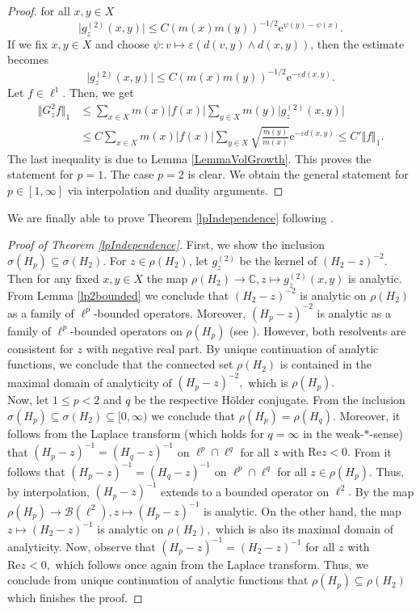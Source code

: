 \documentclass[10pt]{amsart}
\theoremstyle{definition}
\begin{document}
\begin{proof}
    for all $x,y\in X$
    \[\vert g_z^{(2)}(x,y)\vert\leq C(m(x)m(y))^{-1\slash 2}\mathrm{e}^{\psi(y)-\psi(x)}.\]
    If we  fix $x,y\in X$ and choose $\psi: v\mapsto \varepsilon (d(v,y)\wedge d(x,y))$, then the estimate becomes
    \[\vert g^{(2)}_z(x,y)\vert\leq C(m(x)m(y))^{-1\slash 2}\mathrm{e}^{-\varepsilon d(x,y)}.\] Let $f\in\ell^1.$ Then, we get
\begin{align*}
    \Vert G^2_zf\Vert_1&\leq\sum_{x\in X }m(x)\vert f(x)\vert\sum_{y\in X }m(y)\vert g^{(2)}_z(x,y)\vert\\&\leq C\sum_{x\in X }m(x)\vert f(x)\vert\sum_{y\in X }\sqrt{\frac{m(y)}{m(x)}}\mathrm{e}^{-\varepsilon d(x,y)}\leq C'\Vert f\Vert_1.
\end{align*}
The last inequality is due to Lemma \ref{LemmaVolGrowth}. This proves the statement for $p = 1.$ The case $p = 2$ is clear. We obtain the general statement for $p\in [1,\infty]$ via interpolation and duality arguments.
\end{proof}
 We are finally able to prove Theorem \ref{lpIndependence} following \cite{BauerHuaKeller}.
 \begin{proof}[Proof of Theorem \ref{lpIndependence}]
    
    First, we show the inclusion $\sigma( H_p)\subseteq \sigma( H_2).$ For $z\in\rho( H_2)$, let $g_z^{(2)}$ be the kernel of $( H_2-z)^{-2}.$ Then for any fixed $x,y\in X$ the map $\rho( H_2)\rightarrow\mathbb{C},z\mapsto g^{(2)}_z(x,y)$ is analytic. From Lemma \ref{lp2bounded} we conclude that $( H_2-z)^{-2}$ is analytic on $\rho( H_2)$ as a family of $\ell^p$-bounded operators. Moreover, $( H_p-z)^{-2}$ is analytic as a family of $\ell^p$-bounded operators on $\rho( H_p)$ (see \cite[Lemma 3.2]{HempelVoigt1986}). However, both resolvents are consistent for $z$ with negative real part. By unique continuation of analytic functions, we conclude that the connected set $\rho( H_2)$ is contained in the maximal domain of analyticity of $( H_p-z)^{-2},$ which is $\rho( H_p).$\\
    Now, let $1\leq p< 2$ and $q$ be the respective H\"older conjugate. From the inclusion $\sigma(H_p)\subseteq\sigma(H_2)\subseteq [0,\infty)$ we conclude that $\rho(H_p) = \rho(H_q).$ Moreover, it follows from the Laplace transform (which holds for $q= \infty$ in the weak-$\ast$-sense) that $(H_p-z)^{-1} = (H_q-z)^{-1}$ on $\ell^p\cap\ell^q$ for all $z$ with $\mathrm{Re}z<0.$ From \cite[Corollary~1.4]{HempelVoigt1987} it follows that $(H_p-z)^{-1} = (H_q-z)^{-1}$ on $\ell^p\cap\ell^q$ for all $z\in\rho(H_p).$ Thus, by interpolation, $(H_p-z)^{-1}$ extends to a bounded operator on $\ell^2.$ By \cite[Theorem~1.2]{HempelVoigt1987} the map $\rho(H_p)\to\mathcal{B}(\ell^2),z\mapsto(H_p-z)^{-1}$ is analytic. On the other hand, the map $z\mapsto (H_2-z)^{-1}$ is analytic on $\rho(H_2),$ which is also its maximal domain of analyticity. Now, observe that $(H_p-z)^{-1} = (H_2-z)^{-1}$ for all $z$ with $\mathrm{Re}z<0,$ which follows once again from the Laplace transform. Thus, we conclude from unique continuation of analytic functions that $\rho(H_p)\subseteq \rho(H_2)$ which finishes the proof.
\end{proof}
\end{document}
